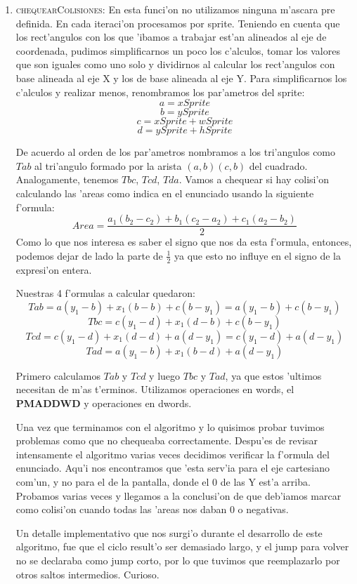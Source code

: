 \begin{enumerate}
\item \textsc{chequearColisiones}:
En esta funci'on no utilizamos ninguna m'ascara pre definida. En cada iteraci'on
procesamos por sprite. Teniendo en cuenta que los rect'angulos con los que
'ibamos a trabajar est'an alineados al eje de coordenada, pudimos simplificarnos
un poco los c'alculos, tomar los valores que son iguales como uno solo y
dividirnos al calcular los rect'angulos con base alineada al eje X y los de base
alineada al eje Y.
Para simplificarnos los c'alculos y realizar menos, renombramos los par'ametros
del sprite:
$$a = xSprite$$
$$b = ySprite$$
$$c = xSprite + wSprite$$
$$d = ySprite + hSprite$$

De acuerdo al orden de los par'ametros nombramos a los tri'angulos como $Tab$ 
al tri'angulo formado por la arista $(a,b)(c,b)$ del cuadrado. Analogamente, tenemos
$Tbc$, $Tcd$, $Tda$. Vamos a chequear si hay colisi'on calculando las 'areas 
como indica en el enunciado usando la siguiente f'ormula:
$$Area= \frac{a_1(b_2-c_2) + b_1(c_2-a_2) + c_1(a_2-b_2)}{2}$$
Como lo que nos interesa es saber el signo que nos da esta f'ormula, entonces,
podemos dejar de lado la parte de $\frac{1}{2}$ ya que esto no influye en el
signo de la expresi'on entera.

Nuestras 4 f'ormulas a calcular quedaron:
$$Tab = a(y_1 - b) + x_1(b - b) + c(b - y_1) = a(y_1 - b) + c(b - y_1)$$
$$Tbc = c(y_1 - d) + x_1(d - b) + c(b - y_1)$$
$$Tcd = c(y_1 - d) + x_1(d - d) + a(d - y_1) = c(y_1 - d) + a(d - y_1)$$
$$Tad = a(y_1 - b) + x_1(b - d) + a(d - y_1)$$

Primero calculamos $Tab$ y $Tcd$ y luego $Tbc$ y $Tad$, ya que estos
'ultimos necesitan de m'as t'erminos. Utilizamos operaciones en words, el
\textbf{PMADDWD}\cite{INT97} y operaciones en dwords.

Una vez que terminamos con el algoritmo y lo quisimos probar tuvimos problemas
como que no chequeaba correctamente. Despu'es de revisar intensamente el
algoritmo varias veces decidimos verificar la f'ormula del enunciado. Aqu'i nos
encontramos que 'esta serv'ia para el eje cartesiano com'un, y no para el de la
pantalla, donde el 0 de las Y est'a arriba. Probamos varias veces y llegamos a
la conclusi'on de que deb'iamos marcar como colisi'on cuando todas las 'areas nos
daban 0 o negativas.

Un detalle implementativo que nos surgi'o durante el desarrollo de este
algoritmo, fue que el ciclo result'o ser demasiado largo, y el jump para volver
no se declaraba como jump corto, por lo que tuvimos que reemplazarlo por otros
saltos intermedios. Curioso.



\end{enumerate}
